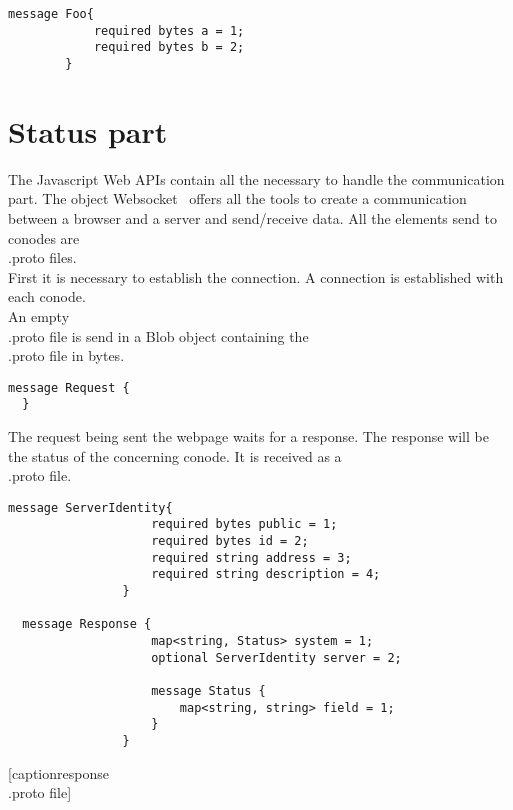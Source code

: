 \documentclass[11pt, a4paper, twoside, openright]{book} %
\begin{document}
\begin{lstlisting}[caption={example of \\.proto file}]
 message Foo{
            required bytes a = 1;
            required bytes b = 2;
        }
\end{lstlisting}

\section{Status part}
The Javascript Web APIs contain all the necessary to handle the communication
part. The object Websocket~\cite{websocketPage} offers all the tools to create a
communication between a browser and a server and send/receive data. All the elements send to conodes are \\.proto files.\\
First it is necessary to establish the connection. A connection is established
with each conode.\\
An empty \\.proto file is send in a Blob object containing the \\.proto file in bytes.\\

\begin{lstlisting}[caption={empty \\.proto file}]
  message Request {
  }
\end{lstlisting}

The request being sent the webpage waits for a response. The response will be the
status of the concerning conode. It is received as a \\.proto file.

\begin{lstlisting}[caption={response \\.proto file}]
  message ServerIdentity{
    				required bytes public = 1;
    				required bytes id = 2;
    				required string address = 3;
    				required string description = 4;
				}

  message Response {
    				map<string, Status> system = 1;
    				optional ServerIdentity server = 2;

				    message Status {
        				map<string, string> field = 1;
    				}
				}
\end{lstlisting}[caption{response \\.proto file}]



{}

\end{document}
